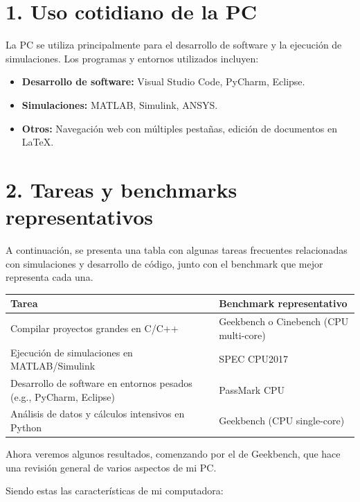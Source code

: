 
\section*{1. Uso cotidiano de la PC}
La PC se utiliza principalmente para el desarrollo de software y la ejecución de simulaciones. Los programas y entornos utilizados incluyen:
\begin{itemize}
    \item \textbf{Desarrollo de software:} Visual Studio Code, PyCharm, Eclipse.
    \item \textbf{Simulaciones:} MATLAB, Simulink, ANSYS.
    \item \textbf{Otros:} Navegación web con múltiples pestañas, edición de documentos en \LaTeX.
\end{itemize}

\section*{2. Tareas y benchmarks representativos}

A continuación, se presenta una tabla con algunas tareas frecuentes relacionadas con simulaciones y desarrollo de código, junto con el benchmark que mejor representa cada una.

\begin{center}
\begin{tabular}{|p{7cm}|p{7cm}|}
\hline
\textbf{Tarea} & \textbf{Benchmark representativo} \\
\hline
Compilar proyectos grandes en C/C++ & Geekbench o Cinebench (CPU multi-core) \\
\hline
Ejecución de simulaciones en MATLAB/Simulink & SPEC CPU2017 \\
\hline
Desarrollo de software en entornos pesados (e.g., PyCharm, Eclipse) & PassMark CPU \\
\hline
Análisis de datos y cálculos intensivos en Python & Geekbench (CPU single-core) \\
\hline
\end{tabular}
\end{center}

Ahora veremos algunos resultados, comenzando por el de Geekbench, que hace una revisión general de varios aspectos de mi PC.

Siendo estas las características de mi computadora:

